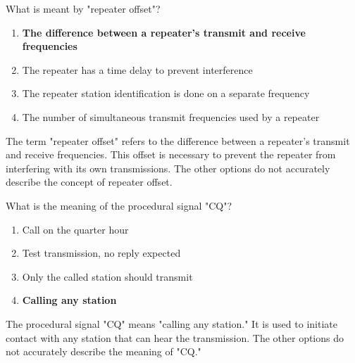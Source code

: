 \begin{tcolorbox}[colback=gray!10!white,colframe=black!75!black,title={T2A07}]
What is meant by "repeater offset"?
\begin{enumerate}[label=\Alph*),noitemsep]
    \item \textbf{The difference between a repeater’s transmit and receive frequencies}
    \item The repeater has a time delay to prevent interference
    \item The repeater station identification is done on a separate frequency
    \item The number of simultaneous transmit frequencies used by a repeater
\end{enumerate}
\end{tcolorbox}
The term "repeater offset" refers to the difference between a repeater’s transmit and receive frequencies. This offset is necessary to prevent the repeater from interfering with its own transmissions. The other options do not accurately describe the concept of repeater offset.

\begin{tcolorbox}[colback=gray!10!white,colframe=black!75!black,title={T2A08}]
What is the meaning of the procedural signal "CQ"?
\begin{enumerate}[label=\Alph*),noitemsep]
    \item Call on the quarter hour
    \item Test transmission, no reply expected
    \item Only the called station should transmit
    \item \textbf{Calling any station}
\end{enumerate}
\end{tcolorbox}
The procedural signal "CQ" means "calling any station." It is used to initiate contact with any station that can hear the transmission. The other options do not accurately describe the meaning of "CQ."

